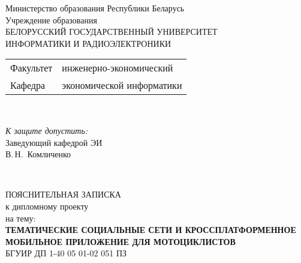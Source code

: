 \begin{titlepage}
  \begin{center}
    Министерство образования Республики Беларусь\\[1em]
    Учреждение образования\\
    БЕЛОРУССКИЙ ГОСУДАРСТВЕННЫЙ УНИВЕРСИТЕТ \\
    ИНФОРМАТИКИ И РАДИОЭЛЕКТРОНИКИ\\[1em]

    \begin{minipage}{\textwidth}
      \begin{flushleft}
        \begin{tabular}{ l l }
          Факультет & инженерно-экономический\\
          Кафедра   & экономической информатики
        \end{tabular}
      \end{flushleft}
    \end{minipage}\\[1em]

    \begin{flushright}
      \begin{minipage}{0.4\textwidth}
        \textit{К защите допустить:}\\[0.8em]
        Заведующий кафедрой ЭИ\\[0.45em]
        \underline{\hspace*{2.6cm}} В.\,Н.~Комличенко
      \end{minipage}\\[2.2em]
    \end{flushright}

    {ПОЯСНИТЕЛЬНАЯ ЗАПИСКА}\\
    {к дипломному проекту}\\
    {на тему:}\\[1em]
    \textbf{\large ТЕМАТИЧЕСКИЕ СОЦИАЛЬНЫЕ СЕТИ И КРОССПЛАТФОРМЕННОЕ МОБИЛЬНОЕ ПРИЛОЖЕНИЕ ДЛЯ МОТОЦИКЛИСТОВ}\\[1em]


    {БГУИР ДП 1-40 05 01-02 051 ПЗ}\\[2em]
    

\end{center}
\end{titlepage}
